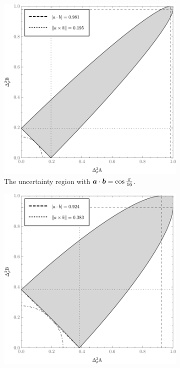 \begin{figure}[ht]
  \begin{subfigure}[b]{0.4\textwidth}\centering
    \includegraphics[width=\textwidth]{figs/new-qubit-error-region-with-upper-and-lower-bounds-pi-by-16-bw}
    \caption{The uncertainty region with $\bm{a}\cdot\bm{b} = \cos\frac{\pi}{16}$.}
    \label{fig:err-region-pi-by-16}
  \end{subfigure}\hfill
  \begin{subfigure}[b]{0.4\textwidth}\centering
    \includegraphics[width=\textwidth]{figs/new-qubit-error-region-with-upper-and-lower-bounds-pi-by-8-bw}

\end{subfigure}
\end{figure}
